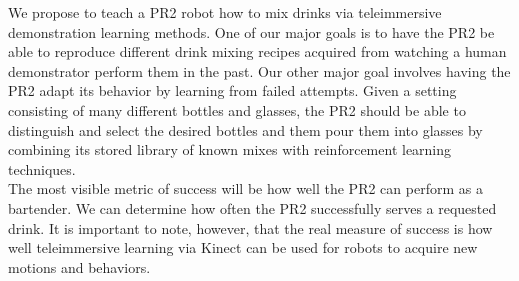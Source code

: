 \documentclass{sig-alternate}
\begin{document}
\label{sec:project_proposal}We propose to teach a PR2 robot how to mix drinks via
teleimmersive demonstration learning methods. One of our major goals is to have the PR2
be able to reproduce different drink mixing recipes acquired from watching
a human demonstrator perform them in the past.
Our other major goal involves having the PR2 adapt its behavior by learning from failed attempts.
Given a setting consisting of many different bottles and glasses, the PR2 should be able to 
distinguish and select the desired bottles and them pour them into glasses by
combining its stored library of known mixes with reinforcement learning techniques.\\
The most visible metric of success will be  how well the PR2
can perform as a bartender. We can determine how often the PR2
successfully serves a requested drink. It is important to note, however, that the real
measure of success is how well teleimmersive learning via Kinect can be used
for robots to acquire new motions and behaviors.
\end{document}
